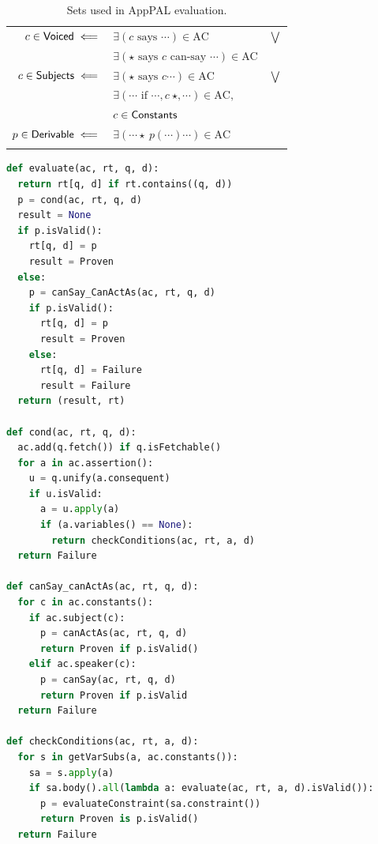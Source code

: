 \documentclass[thesis.tex]{subfiles}
\begin{document}
\begin{table}
  \centering
  \newcommand{\myset}[1]{\ensuremath{\text{\sffamily #1}}}
  \begin{tabular}{r l c}
    \toprule
    $c \in \myset{Voiced} \impliedby$     & $\exists \left(c \text{~says~} \cdots\right) \in \text{AC}$                        & $\bigvee$ \\
                                          & $\exists \left(\star \text{~says~} c \text{~can-say~} \cdots\right) \in \text{AC}$ &           \\
    $c \in \myset{Subjects} \impliedby$   & $\exists \left(\star \text{~says~} c\cdots\right) \in \text{AC}$                   & $\bigvee$ \\
                                          & $\exists \left(\cdots \text{~if~} \cdots,c~\star,\cdots\right) \in \text{AC},$     &           \\
                                          & $c \in \myset{Constants}$                                                          &           \\
    $p \in \myset{Derivable} \impliedby$  & $\exists \left( \cdots \star~p\left(\cdots\right) \cdots\right) \in \text{AC}$     &           \\
    \bottomrule                          \\
  \end{tabular}
  \caption{Sets used in AppPAL evaluation.}
\end{table}


\begin{lstlisting}[language=Python, float, caption={Pseudocode for evaluating AppPAL.}]
def evaluate(ac, rt, q, d):
  return rt[q, d] if rt.contains((q, d))
  p = cond(ac, rt, q, d)
  result = None
  if p.isValid():
    rt[q, d] = p 
    result = Proven
  else:
    p = canSay_CanActAs(ac, rt, q, d)
    if p.isValid():
      rt[q, d] = p 
      result = Proven
    else:
      rt[q, d] = Failure
      result = Failure
  return (result, rt)

def cond(ac, rt, q, d):
  ac.add(q.fetch()) if q.isFetchable()
  for a in ac.assertion():
    u = q.unify(a.consequent)
    if u.isValid:
      a = u.apply(a)
      if (a.variables() == None):
        return checkConditions(ac, rt, a, d)
  return Failure

def canSay_canActAs(ac, rt, q, d):
  for c in ac.constants():
    if ac.subject(c):
      p = canActAs(ac, rt, q, d)
      return Proven if p.isValid()
    elif ac.speaker(c):
      p = canSay(ac, rt, q, d)
      return Proven if p.isValid
  return Failure

def checkConditions(ac, rt, a, d):
  for s in getVarSubs(a, ac.constants()):
    sa = s.apply(a)
    if sa.body().all(lambda a: evaluate(ac, rt, a, d).isValid()):
      p = evaluateConstraint(sa.constraint())
      return Proven is p.isValid()
  return Failure
\end{lstlisting}
\end{document}
